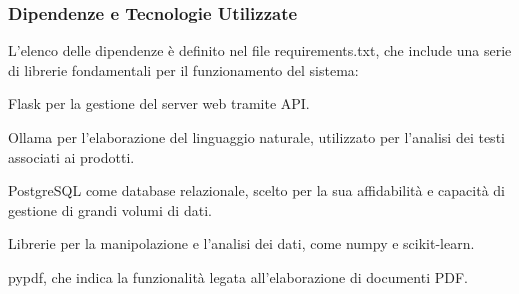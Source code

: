 \subsubsection{ Dipendenze e Tecnologie Utilizzate}
\item L’elenco delle dipendenze è definito nel file requirements.txt, che include una serie di librerie fondamentali per il funzionamento del sistema:

\item Flask per la gestione del server web tramite API.

\item Ollama per l’elaborazione del linguaggio naturale,  utilizzato per l'analisi dei testi associati ai prodotti.

\item PostgreSQL come database relazionale, scelto per la sua affidabilità e capacità di gestione di grandi volumi di dati.

\item Librerie per la manipolazione e l'analisi dei dati, come numpy e scikit-learn.

\item pypdf, che indica la funzionalità legata all'elaborazione di documenti PDF.
